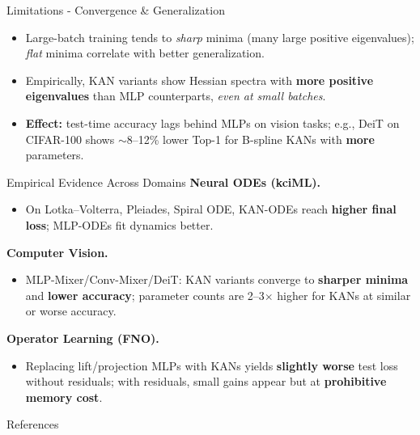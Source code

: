 \documentclass[aspectratio=169]{beamer}
\begin{document}
\begin{frame}{Limitations - Convergence \& Generalization}
	\begin{itemize}
		\item Large-batch training tends to \emph{sharp} minima (many large positive eigenvalues); \emph{flat} minima correlate with better generalization.
		\item Empirically, KAN variants show Hessian spectra with \textbf{more positive eigenvalues} than MLP counterparts, \emph{even at small batches}.
		\item \textbf{Effect:} test-time accuracy lags behind MLPs on vision tasks; e.g., DeiT on CIFAR-100 shows $\sim$8--12\% lower Top-1 for B-spline KANs with \textbf{more} parameters.
	\end{itemize}
\end{frame}


\begin{frame}{Empirical Evidence Across Domains}
	\textbf{Neural ODEs (kciML).}
	\begin{itemize}
		\item On Lotka–Volterra, Pleiades, Spiral ODE, KAN-ODEs reach \textbf{higher final loss}; MLP-ODEs fit dynamics better.
	\end{itemize}
	
	\textbf{Computer Vision.}
	\begin{itemize}
		\item MLP-Mixer/Conv-Mixer/DeiT: KAN variants converge to \textbf{sharper minima} and \textbf{lower accuracy}; parameter counts are 2--3$\times$ higher for KANs at similar or worse accuracy.
	\end{itemize}
	
	\textbf{Operator Learning (FNO).}
	\begin{itemize}
		\item Replacing lift/projection MLPs with KANs yields \textbf{slightly worse} test loss without residuals; with residuals, small gains appear but at \textbf{prohibitive memory cost}.
	\end{itemize}
\end{frame}


\begin{frame}{References}
	\nocite{liu_kan_2025}
	\nocite{pal_understanding_nodate}
	\printbibliography[heading=none]
\end{frame}
\end{document}
